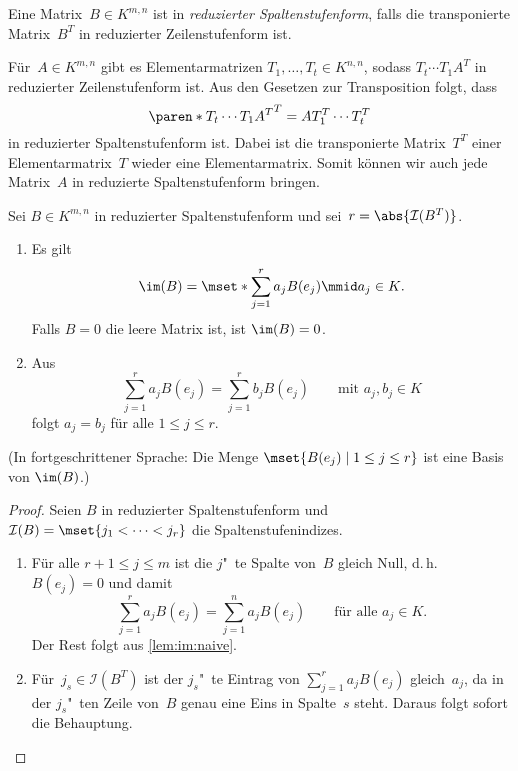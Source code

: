 \documentclass[a4paper]{article}
\begin{document}
\begin{definition}
    Eine Matrix~$B \in K^{m,n}$ ist in \emph{reduzierter Spaltenstufenform}, falls die transponierte Matrix~$B^T$ in reduzierter Zeilenstufenform ist.
\end{definition}

\begin{remark}
    Für~$A \in K^{m,n}$ gibt es Elementarmatrizen $T_1,\dots,T_t \in K^{n,n}$, sodass $T_t\cdots T_1A^T$ in reduzierter Zeilenstufenform ist. Aus den Gesetzen zur Transposition folgt, dass
    \begin{equation*}
        \paren*{T_t \cdots T_1 A^T}^T = A T_1^T \cdots T_t^T
    \end{equation*}
    in reduzierter Spaltenstufenform ist. Dabei ist die transponierte Matrix~$T^T$ einer Elementarmatrix~$T$ wieder eine Elementarmatrix. Somit können wir auch jede Matrix~$A$ in reduzierte Spaltenstufenform bringen.
\end{remark}

\begin{theorem}
    Sei $B \in K^{m,n}$ in reduzierter Spaltenstufenform und sei~$r = \abs{\mathcal{I}(B^T)}$.
    \begin{enumerate}
        \item Es gilt
        \begin{equation*}
            \im(B) = \mset*{\sum_{j=1}^r a_jB(e_j) \mmid a_j \in K}.
        \end{equation*}
        Falls $B = 0$ die leere Matrix ist, ist $\im(B) = 0$.
        \item Aus
        \begin{equation*}
            \sum_{j=1}^r a_jB(e_j) = \sum_{j=1}^r b_jB(e_j) \qquad\text{mit } a_j,b_j \in K
        \end{equation*}
        folgt $a_j = b_j$ für alle $1 \leq j \leq r$.
    \end{enumerate}
    (In fortgeschrittener Sprache: Die Menge $\mset{B(e_j) \mid 1 \leq j \leq r}$ ist eine Basis von $\im(B)$.)
\end{theorem}

\begin{proof}
    Seien $B$ in reduzierter Spaltenstufenform und $\mathcal{I}(B) = \mset{j_1 < \dots < j_r}$ die Spaltenstufenindizes.
    \begin{enumerate}
        \item Für alle $r+1 \leq j \leq m$ ist die $j$"~te Spalte von~$B$ gleich Null, d.\,h.\ $B(e_j) = 0$ und damit
        \begin{equation*}
            \sum_{j=1}^r a_jB(e_j) = \sum_{j=1}^n a_jB(e_j) \qquad\text{für alle } a_j \in K.
        \end{equation*}
        Der Rest folgt aus \cref{lem:im:naive}.
        \item Für~$j_s \in \mathcal{I}(B^T)$ ist der $j_s$"~te Eintrag von $\sum_{j=1}^r a_jB(e_j)$ gleich~$a_j$, da in der $j_s$"~ten Zeile von~$B$ genau eine Eins in Spalte~$s$ steht. Daraus folgt sofort die Behauptung.\qedhere
    \end{enumerate}
\end{proof}
\end{document}
